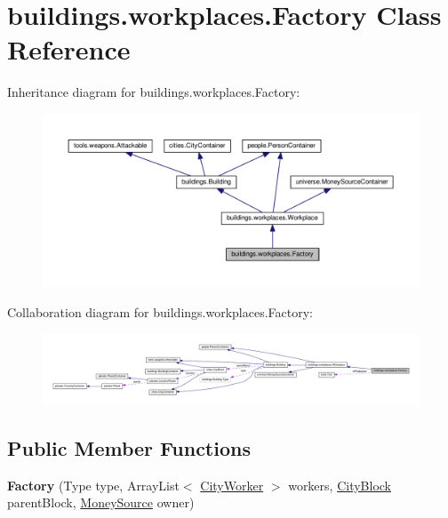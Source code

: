 \hypertarget{classbuildings_1_1workplaces_1_1_factory}{}\section{buildings.\+workplaces.\+Factory Class Reference}
\label{classbuildings_1_1workplaces_1_1_factory}


Inheritance diagram for buildings.\+workplaces.\+Factory\+:\nopagebreak
\begin{figure}[H]
\begin{center}
\leavevmode
\includegraphics[width=350pt]{classbuildings_1_1workplaces_1_1_factory__inherit__graph}
\end{center}
\end{figure}


Collaboration diagram for buildings.\+workplaces.\+Factory\+:\nopagebreak
\begin{figure}[H]
\begin{center}
\leavevmode
\includegraphics[width=350pt]{classbuildings_1_1workplaces_1_1_factory__coll__graph}
\end{center}
\end{figure}
\subsection*{Public Member Functions}
\begin{DoxyCompactItemize}
\item 
{\bfseries Factory} (Type type, Array\+List$<$ \hyperlink{classpeople_1_1cityworkers_1_1_city_worker}{City\+Worker} $>$ workers, \hyperlink{classcities_1_1_city_block}{City\+Block} parent\+Block, \hyperlink{classuniverse_1_1_money_source}{Money\+Source} owner)\hypertarget{classbuildings_1_1workplaces_1_1_factory_aa6d7470db720656ef3d93f933ac55409}{}\label{classbuildings_1_1workplaces_1_1_factory_aa6d7470db720656ef3d93f933ac55409}

\end{DoxyCompactItemize}
